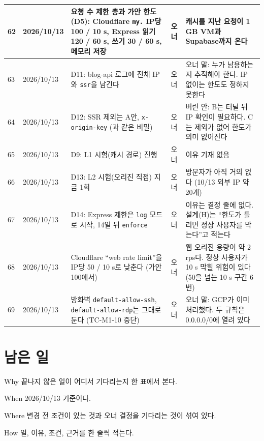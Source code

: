 \begin{longtable}{L{0.8cm} L{1.9cm} L{5.2cm} L{1.5cm} L{4.3cm}}
  \midrule
  62 & 2026/10/13 & 요청 수 제한 층과 가안 한도 (D5): Cloudflare \texttt{my.} IP당 100 / 10 s, Express 읽기 120 / 60 s, 쓰기 30 / 60 s, 메모리 저장 & 오너 & 캐시를 지난 요청이 1 GB VM과 Supabase까지 온다 \\
  \midrule
  63 & 2026/10/13 & D11: blog-api 로그에 전체 IP와 \texttt{ssr}을 남긴다 & 오너 & 오너 말: 누가 남용하는지 추적해야 한다. IP 없이는 한도도 정하지 못한다 \\
  \midrule
  64 & 2026/10/13 & D12: SSR 제외는 A안, \texttt{x-origin-key} (과 같은 비밀) & 오너 & 버린 안: B는 터널 뒤 IP 확인이 필요하다. C는 제외가 없어 한도가 의미 없어진다 \\
  \midrule
  65 & 2026/10/13 & D9: L1 시험(캐시  경로) 진행 & 오너 & 이유 기재 없음 \\
  \midrule
  66 & 2026/10/13 & D13: L2 시험(오리진 직접) 지금 1회 & 오너 & 방문자가 아직 거의 없다 (10/13 외부 IP 약 20개) \\
  \midrule
  67 & 2026/10/13 & D14: Express 제한은 \texttt{log} 모드로 시작, 14일 뒤 \texttt{enforce} & 오너 & 이유는 결정 줄에 없다. 설계(H)는 ``한도가 틀리면 정상 사용자를 막는다''고 적는다 \\
  \midrule
  68 & 2026/10/13 & Cloudflare ``web rate limit''을 IP당 50 / 10 s로 낮춘다 (가안 100에서) & 오너 & 웹 오리진  용량이 약 2 rps다. 정상 사용자가 10 s 막힐 위험이 있다 (50을 넘는 10 s 구간 6번) \\
  \midrule
  69 & 2026/10/13 & 방화벽 \texttt{default-allow-ssh}, \texttt{default-allow-rdp}는 그대로 둔다 (TC-M1-10 중단) & 오너 & 오너 말: GCP가 이미 처리했다. 두 규칙은 0.0.0.0/0에 열려 있다 \\
\end{longtable}
\normalsize

\section{남은 일}\label{sec:08-open}

\begin{inbrief}
  \item[Why] 끝나지 않은 일이 어디서 기다리는지 한 표에서 본다.
  \item[When] 2026/10/13 기준이다.
  \item[Where] 변경 전 조건이 있는 것과 오너 결정을 기다리는 것이 섞여 있다.
  \item[How] 일, 이유, 조건, 근거를 한 줄씩 적는다.
\end{inbrief}

